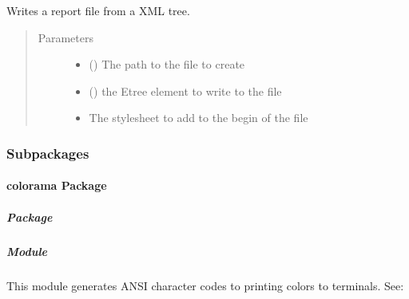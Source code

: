 \documentclass[a4paper,10pt,english]{sphinxmanual}
\begin{document}
\begin{fulllineitems}
\label{\detokenize{commands/apidoc/src:src.xmlManager.write_report}}
Writes a report file from a XML tree.
\begin{quote}\begin{description}
\item[{Parameters}] \leavevmode\begin{itemize}
\item {} 
 () \textendash{} The path to the file to create

\item {} 
 () \textendash{} the Etree element to write to the file

\item {} 
 \textendash{} The stylesheet to add to the begin of the file

\end{itemize}

\end{description}\end{quote}

\end{fulllineitems}



\subsubsection{Subpackages}
\label{\detokenize{commands/apidoc/src:subpackages}}

\paragraph{colorama Package}
\label{\detokenize{commands/apidoc/src.colorama:colorama-package}}\label{\detokenize{commands/apidoc/src.colorama::doc}}

\subparagraph{ Package}
\label{\detokenize{commands/apidoc/src.colorama:id1}}\label{\detokenize{commands/apidoc/src.colorama:module-src.colorama}}

\subparagraph{ Module}
\label{\detokenize{commands/apidoc/src.colorama:module-src.colorama.ansi}}\label{\detokenize{commands/apidoc/src.colorama:ansi-module}}
This module generates ANSI character codes to printing colors to terminals.
See: 
\end{document}
